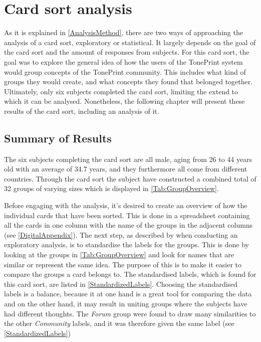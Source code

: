 \chapter{Card sort analysis}
\label{CardSortAnalysis}
As it is explained in \autoref{AnalysisMethod}, there are two ways of approaching the analysis of a card sort, exploratory or statistical. It largely depends on the goal of the card sort and the amount of responses from subjects. For this card sort, the goal was to explore the general idea of how the users of the TonePrint system would group concepts of the TonePrint community. This includes what kind of groups they would create, and what concepts they found that belonged together. Ultimately, only six subjects completed the card sort, limiting the extend to which it can be analysed. Nonetheless, the following chapter will present these results of the card sort, including an analysis of it.

\section{Summary of Results}
\label{SummaryResults}
The six subjects completing the card sort are all male, aging from 26 to 44 years old with an average of 34.7 years, and they furthermore all come from different countries. Through the card sort the subject have constructed a combined total of 32 groups of varying sizes which is displayed in \autoref{Tab:GroupOverview}.

Before engaging with the analysis, it's desired to create an overview of how the individual cards that have been sorted. This is done in a spreadsheet containing all the cards in one column with the name of the groups in the adjacent columns (see \autoref{DigitalAppendix}). The next step, as described by \textcite[184]{WEB:DonnaSpencer} when conducting an exploratory analysis, is to standardise the labels for the groups. This is done by looking at the groups in \autoref{Tab:GroupOverview} and look for names that are similar or represent the same idea. The purpose of this is to make it easier to compare the groups a card belongs to. The standardised labels, which is found for this card sort, are listed in \autoref{StandardizedLabels}. Choosing the standardised labels is a balance, because it at one hand is a great tool for comparing the data and on the other hand, it may result in uniting groups where the subjects have had different thoughts. The \textit{Forum} group were found to draw many similarities to the other \textit{Community} labels, and it was therefore given the same label (see \autoref{StandardizedLabels}) \\ 

